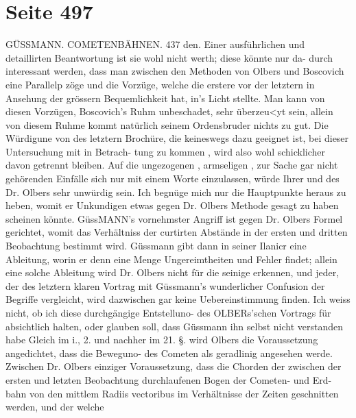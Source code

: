 \documentclass[10pt,a4paper]{article}
\begin{document}
\newpage
\section*{Seite 497}

GÜSSMANN.     COMETENBÄHNEN.  437
den.  Einer  ausführlichen  und  detaillirten  Beantwortung  ist  sie  wohl  nicht  werth;  diese  könnte  nur  da-
durch interessant  werden,  dass  man  zwischen  den  Methoden  von  Olbers  und  Boscovich  eine  Parallelp
zöge  und  die  Vorzüge,  welche  die  erstere  vor  der  letztern  in  Ansehung  der  grössern  Bequemlichkeit
hat,  in's  Licht  stellte.  Man  kann  von  diesen  Vorzügen,  Boscovich's  Ruhm  unbeschadet,  sehr  überzeu<yt
sein,  allein  von  diesem  Ruhme  kommt  natürlich  seinem  Ordensbruder  nichts  zu  gut.  Die  Würdigune
von  des  letztern  Brochüre,  die  keineswegs  dazu  geeignet  ist,  bei  dieser  Untersuchung  mit  in  Betrach-
tung zu  kommen ,  wird  also  wohl  schicklicher  davon  getrennt  bleiben.
Auf  die  ungezogenen ,  armseligen ,  zur  Sache  gar  nicht  gehörenden  Einfälle  sich  nur  mit  einem
Worte  einzulassen,  würde  Ihrer  und  des  Dr.  Olbers  sehr  unwürdig  sein.  Ich  begnüge  mich  nur  die
Hauptpunkte  heraus  zu  heben,  womit  er  Unkundigen  etwas  gegen  Dr.  Olbers  Methode  gesagt  zu  haben
scheinen  könnte.
GüssMANN's  vornehmster  Angriff  ist  gegen    Dr.  Olbers  Formel   gerichtet,    womit  das    Verhältniss
der  curtirten  Abstände  in  der  ersten  und  dritten  Beobachtung  bestimmt  wird.     Güssmann  gibt  dann  in
seiner  Ilanicr  eine  Ableitung,  worin  er  denn  eine  Menge  Ungereimtheiten  und  Fehler  findet;  allein  eine
solche  Ableitung  wird  Dr.  Olbers   nicht  für  die  seinige  erkennen,    und  jeder,    der   des   letztern  klaren
Vortrag    mit  Güssmann's    wunderlicher   Confusion    der  Begriffe   vergleicht,    wird    dazwischen  gar  keine
Uebereinstimmung  finden.      Ich  weiss   nicht,    ob   ich    diese  durchgängige   Entstelluno-   des   OLBERs'schen
Vortrags    für   absichtlich  halten,    oder   glauben   soll,    dass  Güssmann   ihn   selbst   nicht   verstanden   habe
Gleich  im  i.,  2.  und  nachher  im  21.  §.  wird  Olbers  die  Voraussetzung  angedichtet,    dass    die    Beweguno-
des  Cometen  als  geradlinig  angesehen  werde.      Zwischen   Dr.  Olbers    einziger   Voraussetzung,    dass  die
Chorden  der  zwischen  der  ersten  und  letzten  Beobachtung  durchlaufenen  Bogen  der  Cometen-  und  Erd-
bahn von  den  mittlem  Radiis  vectoribus  im  Verhältnisse  der  Zeiten  geschnitten  werden,  und  der    welche
\end{document}
